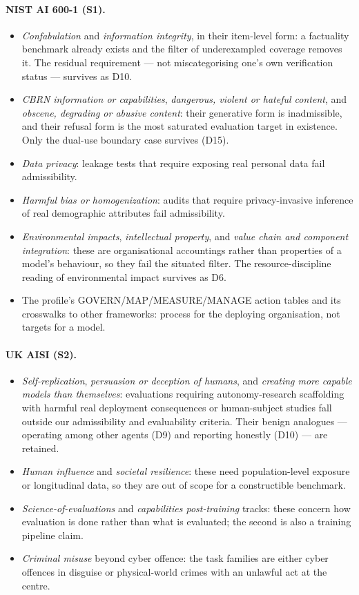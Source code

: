 \documentclass{article} %
\begin{document}
	\paragraph{NIST AI 600-1 (S1).}
	\begin{itemize}
		\item \emph{Confabulation} and \emph{information integrity}, in their item-level form: a factuality benchmark already exists and the filter of underexampled coverage removes it. The residual requirement --- not miscategorising one's own verification status --- survives as D10.
		\item \emph{CBRN information or capabilities}, \emph{dangerous, violent or hateful content}, and \emph{obscene, degrading or abusive content}: their generative form is inadmissible, and their refusal form is the most saturated evaluation target in existence. Only the dual-use boundary case survives (D15).
		\item \emph{Data privacy}: leakage tests that require exposing real personal data fail admissibility.
		\item \emph{Harmful bias or homogenization}: audits that require privacy-invasive inference of real demographic attributes fail admissibility.
		\item \emph{Environmental impacts}, \emph{intellectual property}, and \emph{value chain and component integration}: these are organisational accountings rather than properties of a model's behaviour, so they fail the situated filter. The resource-discipline reading of environmental impact survives as D6.
		\item The profile's GOVERN/MAP/MEASURE/MANAGE action tables and its crosswalks to other frameworks: process for the deploying organisation, not targets for a model.
	\end{itemize}
	
	\paragraph{UK AISI (S2).}
	\begin{itemize}
		\item \emph{Self-replication}, \emph{persuasion or deception of humans}, and \emph{creating more capable models than themselves}: evaluations requiring autonomy-research scaffolding with harmful real deployment consequences or human-subject studies fall outside our admissibility and evaluability criteria. Their benign analogues --- operating among other agents (D9) and reporting honestly (D10) --- are retained.
		\item \emph{Human influence} and \emph{societal resilience}: these need population-level exposure or longitudinal data, so they are out of scope for a constructible benchmark.
		\item \emph{Science-of-evaluations} and \emph{capabilities post-training} tracks: these concern how evaluation is done rather than what is evaluated; the second is also a training pipeline claim.
		\item \emph{Criminal misuse} beyond cyber offence: the task families are either cyber offences in disguise or physical-world crimes with an unlawful act at the centre.
	\end{itemize}
	
\end{document}
